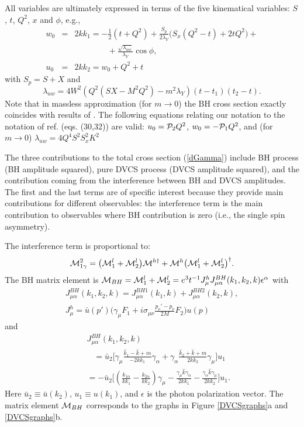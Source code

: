 \documentclass[aps,prd,reprint,groupedaddress,preprintnumbers,showpacs]{revtex4-1}
\begin{document}
All variables are ultimately expressed in terms of the five kinematical variables: $S$, $t$, $Q^2$, $x$ and $\phi$, e.g.,
\begin{eqnarray}
w_0&=& 2kk_1=-\frac{1}{2}(t+Q^2)
+\frac{S_p}{2\lambda_Y}\bigl(S_x(Q^2-t)+2tQ^2\bigr)+
\nonumber\\&& \qquad \qquad
+\frac{\sqrt{\lambda_{uw}}}{\lambda_{Y}}\cos\phi ,
\nonumber \\
u_0&=& 2kk_2=w_0+Q^2+t
\end{eqnarray}
with $S_p=S+X$ and 
\begin{equation}\label{lambdauw}
\lambda_{uw}=4W^2(Q^2(SX-M^2Q^2)-m^2\lambda_Y)(t-t_1)(t_2-t).
\end{equation}
Note that in massless approximation (for $m\rightarrow 0$) the BH cross section exactly coincides with results of \cite{BKM2002}.  
The following equations relating our notation to the notation of ref. \cite{BKM2002} (eqs. (30,32)) 
are valid: $u_0={\cal P}_2Q^2$, $w_0=-{\cal P}_1Q^2$, and (for $m\rightarrow 0$) $\lambda_{uw}=4Q^4S^2S_x^2K^2$ 

The three contributions to the total cross section (\ref{dGamma}) include BH process (BH amplitude squared), pure DVCS process (DVCS amplitude squared), and the contribution coming from the interference between BH and DVCS 
amplitudes. The first and the last terms are of specific interest because they provide main contributions for different 
observables: the interference term is the main contribution to observables where BH contribution is zero (i.e., the single spin 
asymmetry).

The interference term is proportional to:  
\begin{equation}\label{Mint2}
{\cal M}_{1\gamma}^2
=\bigl( {\cal M}_1^l+{\cal M}_2^l\bigr){\cal M}^{h\dagger}+{\cal M}^h\bigl( {\cal M}_1^l+{\cal M}_2^l\bigr)^\dagger .
\end{equation}
The BH matrix element is 
${\cal M}_{BH}={\cal M}_1^l+{\cal M}_2^l=e^3t^{-1}J^h_\mu J_{\mu \alpha}^{BH}(k_1,k_2,k)\epsilon^{\alpha }$ with 
\begin{eqnarray}
J_{\mu \alpha}^{BH}(k_1,k_2,k)=
J_{\mu \alpha}^{BH1}(k_1,k)+
J_{\mu \alpha}^{BH2}(k_2,k),
\nonumber\\[2mm]
J^h_\mu={\bar u}(p')\biggl(\gamma_{\mu}F_1+i\sigma_{\mu\nu}\frac{p_\nu '-p_\nu}{2M}F_2\biggr)u(p)
\end{eqnarray}
and
\begin{eqnarray}
&&
J_{\mu\alpha }^{BH}(k_1,k_2,k) 
\nonumber \\&&\;\;\;=
{\bar u}_2\Biggl [
 \gamma_\mu \frac{{\hat k}_1-{\hat k}+m}{-2kk_1}\gamma_\alpha
+ \gamma_\alpha \frac{{\hat k}_2+{\hat k}+m}{2kk_2}\gamma_\mu 
\Biggr ]u_1
\nonumber \\
&&=- 
{\bar u}_2\Biggl [\left(\frac {k_{1\alpha}}{kk_1}-\frac {k_{2\alpha}}{kk_2}\right)\gamma_\mu
-\frac{\gamma_\mu \hat{k}\gamma_\alpha}{2kk_1}
-\frac{\gamma_\alpha\hat{k}\gamma_\mu }{2kk_2}
\Biggr ]u_1.
\end{eqnarray}
Here ${\bar u}_2\equiv {\bar u}(k_2)$, ${u}_1\equiv {u}(k_1)$, and $\epsilon$ is the photon polarization vector. 
The matrix element ${\cal M}_{BH}$ corresponds to the graphs in Figure 
\ref{DVCSgraphs}a and \ref{DVCSgraphs}b.
\end{document}
